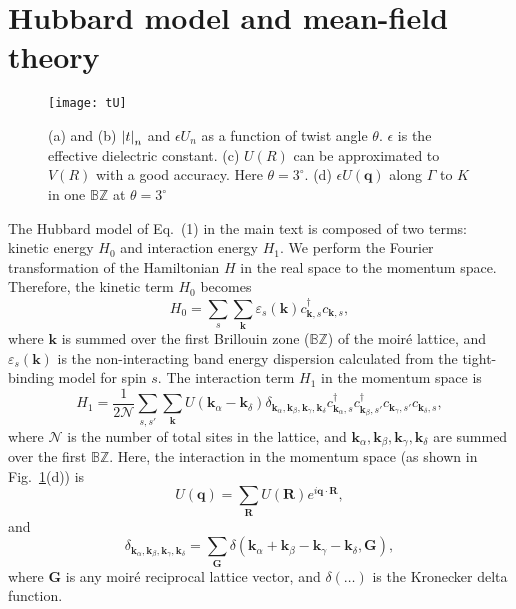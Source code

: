 \documentclass[aps,prl,floatfix,twocolumn]{revtex4-1}
\begin{document}
\section{Hubbard model and mean-field theory}

\begin{figure}[t]
	\centering
	\texttt{[image: tU]}
	\caption{(a) and (b) $ \abs{t}_n $ and $\epsilon U_n $ as a function of twist angle $ \theta $. $ \epsilon $ is the effective dielectric constant. (c) $ U(R) $ can be approximated to $ V(R) $ with a good accuracy. Here $ \theta=3^\circ. $ (d) $ \epsilon U(\bm{q}) $ along $ \Gamma $ to $ K $ in one $ \mathbb{BZ} $ at  $ \theta=3^\circ$}
	\label{fig:tU}
\end{figure}



The Hubbard model of Eq.~(1) in the main text is composed of two terms: kinetic energy $ H_0 $ and interaction energy $ H_1 $. We perform the Fourier transformation of the Hamiltonian $ H $ in the real space to the momentum space. Therefore, the kinetic term $ H_0 $ becomes
\begin{equation}\label{eq:H0}
	H_0=\sum_{s}\sum_{{\bm{k}}}^{}\varepsilon_s(\bm{k}) c_{\bm{k},s}^\dagger c_{\bm{k},s},
\end{equation}
where $ \bm{k} $ is summed over the first Brillouin zone ($\mathbb{BZ}$) of the moir\'e lattice, and $ \varepsilon_s(\bm{k}) $ is the non-interacting band energy dispersion calculated from the tight-binding model for spin $ s $. The interaction term $ H_1 $ in the momentum space is 
\begin{equation}\label{eq:H1}
	H_1=\frac{1}{2\mathcal{N}}\sum_{s,s'} \sum_{\bm{k}} U(\bm{k}_\alpha-\bm{k}_\delta)\delta_{\bm{k}_\alpha,\bm{k}_\beta,\bm{k}_\gamma,\bm{k}_\delta} c_{\bm{k}_\alpha,s}^\dagger c_{\bm{k}_\beta,s'}^\dagger c_{\bm{k}_\gamma,s'} c_{\bm{k}_\delta,s},
\end{equation}
where $ \mathcal{N} $ is the number of total sites in the lattice, and  $ \bm{k}_\alpha,\bm{k}_\beta,\bm{k}_\gamma , \bm{k}_\delta $ are summed over the first $ \mathbb{BZ} $. Here, the interaction in the momentum space (as shown in Fig.~\ref{fig:tU}(d)) is
\begin{equation}
	U(\bm{q})=\sum_{\bm{R}}U(\bm{R})e^{i\bm{q}\cdot\bm{R}},
\end{equation}
and
\begin{equation}
	\delta_{\bm{k}_\alpha,\bm{k}_\beta,\bm{k}_\gamma,\bm{k}_\delta}=\sum_{\bm{G}}\delta(\bm{k}_\alpha+\bm{k}_\beta-\bm{k}_\gamma-\bm{k}_\delta,\bm{G}),
\end{equation}
where  $ \bm{G} $ is any moir\'e reciprocal lattice vector, and $ \delta(\dots) $ is the Kronecker delta function.
\end{document}
